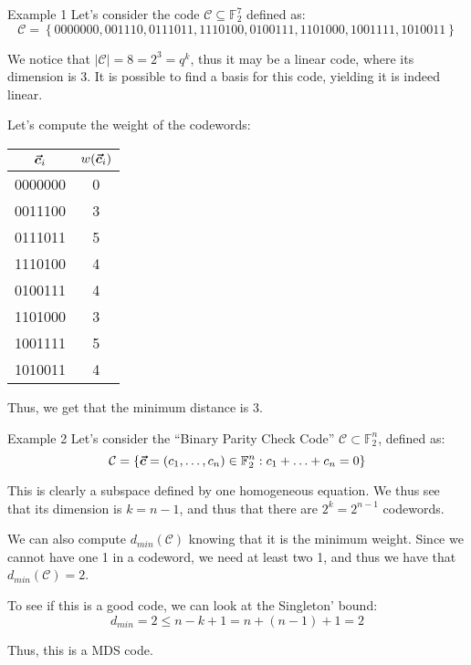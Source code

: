 \documentclass[a4paper]{article}
\begin{document}
\begin{parag}{Example 1}
    Let's consider the code $\mathcal{C} \subseteq \mathbb{F}_2^7$ defined as:
    \[\mathcal{C} = \left\{0000000, 001110, 0111011, 1110100, 0100111, 1101000, 1001111, 1010011\right\}\]

    We notice that $\left|\mathcal{C}\right| = 8 = 2^3 = q^k$, thus it may be a linear code, where its dimension is 3. It is possible to find a basis for this code, yielding it is indeed linear.

    Let's compute the weight of the codewords:
    \begin{center}
    \begin{tabular}{cc}
        $\bm{\protect\vec{c}}_i$ & $w\left(\bvec{c}_i\right)$ \\
        \hline
        0000000 & 0 \\
        0011100 & 3 \\
        0111011 & 5 \\
        1110100 & 4 \\
        0100111 & 4 \\
        1101000 & 3 \\
        1001111 & 5 \\
        1010011 & 4
    \end{tabular}
    \end{center}

    Thus, we get that the minimum distance is 3.
\end{parag}

\begin{parag}{Example 2}
    Let's consider the ``Binary Parity Check Code'' $\mathcal{C} \subset \mathbb{F}_2^n$, defined as:
    \[\mathcal{C} = \left\{\bvec{c} = \left(c_1, \ldots, c_n\right) \in \mathbb{F}_2^{n} : c_1 + \ldots + c_n = 0\right\}\]

    This is clearly a subspace defined by one homogeneous equation. We thus see that its dimension is $k = n- 1$, and thus that there are $2^k = 2^{n-1}$ codewords.

    We can also compute $d_{min}\left(\mathcal{C}\right)$ knowing that it is the minimum weight. Since we cannot have one 1 in a codeword, we need at least two 1, and thus we have that $d_{min}\left(\mathcal{C}\right) = 2$.

    To see if this is a good code, we can look at the Singleton' bound:
    \[d_{min} = 2 \leq n - k + 1 = n + \left(n-1\right) + 1 = 2\]

    Thus, this is a MDS code.
\end{parag}
\end{document}
